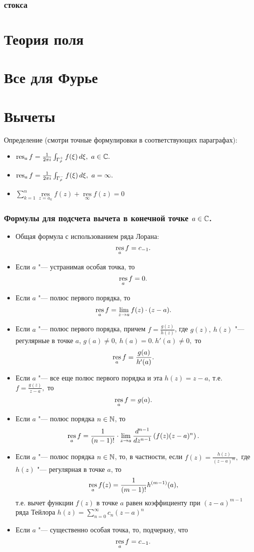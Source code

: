 \subsubsection{стокса}

\section{Теория поля}

\section{Все для Фурье}


\section{Вычеты}
\noindent Определение (смотри точные формулировки в соответствующих параграфах):
\begin{itemize}
\item
$\operatorname*{res}_a f=\frac{1}{2\pi i} \int_{\Gamma_{\rho}^{+}} f(\xi)\, d\xi,\ a\in\mathbb{C}.$
\item
$\operatorname*{res}_a f=\frac{1}{2\pi i} \int_{\Gamma_{\rho}^{-}} f(\xi)\, d\xi,\ a=\infty.$
\item
$\sum _{k=1}^{n}\mathop {\mathrm {res} } \limits _{z=a_{k}}f(z) + \mathop {\mathrm {res}} \limits _{\infty } f(z) = 0 $
\end{itemize}

\subsubsection{Формулы для подсчета вычета в конечной точке $a \in \mathbb{C}$.}
\begin{itemize}
\item
Общая формула с использованием ряда Лорана:
$$\operatorname*{res}_a f = c_{-1}.$$
\item
Если $a$ "--- устранимая особая точка, то
$$\operatorname*{res}_a f=0.$$
\item 
Если $a$ "--- полюс первого порядка, то
$$\operatorname*{res}_a f=\lim_{z\to a}{f(z)\cdot(z-a)}.$$
\item
Если $a$ "--- полюс первого порядка, причем $f=\frac{g(z)}{h(z)}$, где $g(z),\ h(z)$ "--- регулярные в точке $a$, $g(a)\neq 0,\ h(a)=0. \ h'(a)\neq 0,$ то 
$$\operatorname*{res}_a f=\frac{g(a)}{h'(a)}.$$
\item
Если $a$ "--- все еще полюс первого порядка и эта $h(z)=z-a$, т.е. $f=\frac{g(z)}{z-a},$ то
$$\operatorname*{res}_a f=g(a).$$
\item
Если $a$ "--- полюс порядка $n\in\mathbb{N}$, то
$$
\operatorname*{res}_a f = \frac{1}{(n-1)!}\cdot \lim\limits_{z\to a} \frac{d^{n-1}}{dz^{n-1}}\left(f(z)(z-a)^n\right).
$$
\item
Если $a$ "--- полюс порядка $n\in\mathbb{N}$, то, в частности, если $f(z)=\frac{h(z)}{(z-a)^m},$ где $h(z)$ "--- регулярная в точке $a$, то 
$$\operatorname*{res}_a f(z) = \frac{1}{(m-1)!} h^{(m-1)}(a),$$
т.е. вычет функции $f(z)$ в точке $a$ равен коэффициенту при $(z-a)^{m-1}$ ряда Тейлора $h(z)=\sum\limits_{n=0}^{\infty} c_n (z-a)^n$

\item
Если  $a$ "--- существенно особая точка, то, подчеркну, что 
$$\operatorname*{res}_a f = c_{-1}.$$
\end{itemize}

